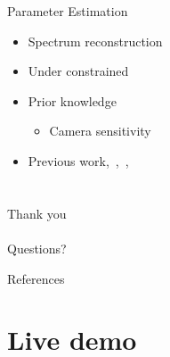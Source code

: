 \documentclass{beamer}
\begin{document}
\begin{frame}{Parameter Estimation}

\begin{itemize}
\setlength\itemsep{0.5em}
\item Spectrum reconstruction
\item Under constrained
\item Prior knowledge
	\begin{itemize}
	\setlength\itemsep{0.5em}
	\item Camera sensitivity
	\end{itemize}
\item Previous work,~\cite{Smits:1999},~\cite{Sun2001},~\cite{Drew:2003}
\end{itemize}

\end{frame}

\section*{}

\begin{frame}[plain,c]

\begin{center}
\huge Thank you
\\~\\
\Large Questions?
\end{center}

\end{frame}


\begin{frame}[allowframebreaks]{References}




\end{frame}

\section{Live demo}


\end{document}
